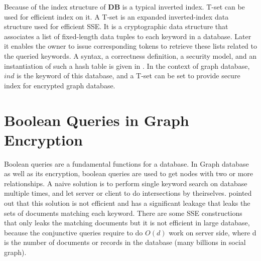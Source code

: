Because of the index structure of $\mathbf{DB}$ is a typical inverted index. T-set can be used for efficient index on it. A T-set is an expanded inverted-index data structure \cite{cash2013highly} used for efficient SSE. It is a cryptographic data structure that associates a list of fixed-length data tuples to each keyword in a database. Later it enables the owner to issue corresponding tokens to retrieve these lists related to the queried keywords. A syntax, a correctness definition, a security model, and an instantiation of such a hash table is given in \cite{cash2013highly}. In the context of graph database, $ind$ is the keyword of this database, and a T-set can be set to provide secure index for encrypted graph database.

\section{Boolean Queries in Graph Encryption}
Boolean queries are a fundamental functions for a database. In Graph database as well as its encryption, boolean queries are used to get nodes with two or more relationships. A naive solution is to perform single keyword search on database multiple times, and let server or client to do intersections by theirselves. \cite{cash2013highly} pointed out that this solution is not efficient and has a significant leakage that leaks the sets of documents matching each keyword. There are some SSE constructions that only leaks the matching documents \cite{curtmola2011searchable} but it is not efficient in large database, because the conjunctive queries require to do $O(d)$ work on server side, where d is the number of documents or records in the database (many billions in social graph). 

